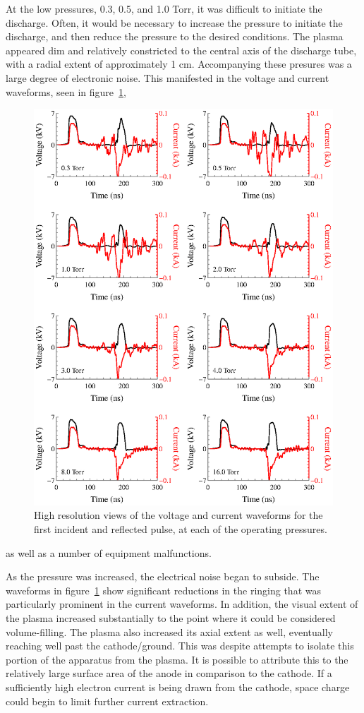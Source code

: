 At the low pressures, 0.3, 0.5, and 1.0 Torr, it was difficult to initiate the
discharge. Often, it would be necessary to increase the pressure to initiate the
discharge, and then reduce the pressure to the desired conditions. The plasma
appeared dim and relatively constricted to the central axis of the discharge
tube, with a radial extent of approximately 1 cm. Accompanying these presures
was a large degree of electronic noise. This manifested in the voltage and
current waveforms, seen in figure~\ref{fig:waveforms}, 
\begin{figure}
  \centering
  \includegraphics{./chapters/experiment/figures/waveforms.eps}
  \caption{High resolution views of the voltage and current waveforms for the
  first incident and reflected pulse, at each of the operating pressures.}
  \label{fig:waveforms}
\end{figure}
as well as a number of equipment malfunctions.

As the pressure was increased, the electrical noise began to subside. The
waveforms in figure~\ref{fig:waveforms} show significant reductions in the
ringing that was particularly prominent in the current waveforms. In addition,
the visual extent of the plasma increased substantially to the point where it
could be considered volume-filling. The plasma also increased its axial extent
as well, eventually reaching well past the cathode/ground. This was despite
attempts to isolate this portion of the apparatus from the plasma. It is
possible to attribute this to the relatively large surface area of the anode in
comparison to the cathode. If a sufficiently high electron current is being
drawn from the cathode, space charge could begin to limit further current
extraction.

